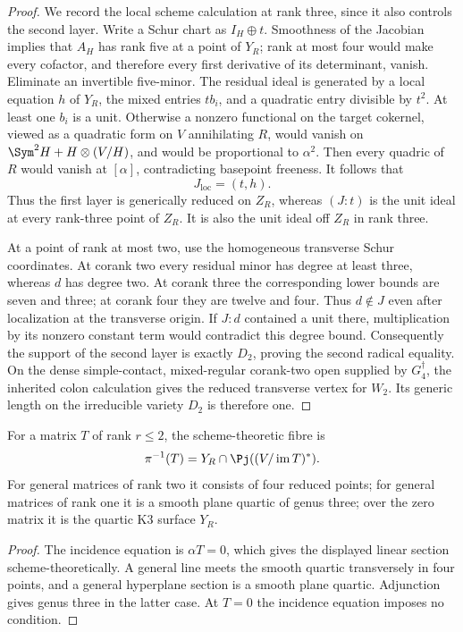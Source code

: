 \begin{proof}
We record the local scheme calculation at rank three, since it also
controls the second layer.  Write a Schur chart as \(I_H\oplus t\).
Smoothness of the Jacobian implies that \(A_H\) has rank five at a
point of \(Y_R\); rank at most four would make every cofactor, and
therefore every first derivative of its determinant, vanish.  Eliminate
an invertible five-minor.  The residual ideal is generated by a local
equation \(h\) of \(Y_R\), the mixed entries \(t b_i\), and a
quadratic entry divisible by \(t^2\).  At least one \(b_i\) is a
unit.  Otherwise a nonzero functional on the target cokernel,
viewed as a quadratic form on \(V\) annihilating \(R\), would
vanish on \(\Sym^2H+H\otimes(V/H)\), and would be proportional to
\(\alpha^2\).  Then every quadric of \(R\) would vanish at
\([\alpha]\), contradicting basepoint freeness.  It follows that
\[
 J_{\mathrm{loc}}=(t,h).
\]
Thus the first layer is generically reduced on \(Z_R\), whereas
\((J:t)\) is the unit ideal at every rank-three point of \(Z_R\).
It is also the unit ideal off \(Z_R\) in rank three.

At a point of rank at most two, use the homogeneous transverse Schur
coordinates.  At corank two every residual minor has degree at least
three, whereas \(d\) has degree two.  At corank three the corresponding
lower bounds are seven and three; at corank four they are twelve and
four.  Thus \(d\notin J\) even after localization at the transverse
origin.  If \(J:d\) contained a unit there, multiplication by its
nonzero constant term would contradict this degree bound.  Consequently
the support of the second layer is exactly \(D_2\), proving the
second radical equality.  On the dense simple-contact, mixed-regular
corank-two open supplied by \(G_4^\dagger\), the inherited colon
calculation gives the reduced transverse vertex for \(W_2\).
Its generic length on the irreducible variety \(D_2\) is therefore
one.
\end{proof}

\begin{corollary}
\label{cor:resolution-fibres}
For a matrix \(T\) of rank \(r\le2\), the scheme-theoretic fibre is
\[
 \pi^{-1}(T)=Y_R\cap\Pj((V/\operatorname{im}T)^*).
\]
For general matrices of rank two it consists of four reduced points;
for general matrices of rank one it is a smooth plane quartic of
genus three; over the zero matrix it is the quartic K3 surface \(Y_R\).
\end{corollary}
\begin{proof}
The incidence equation is \(\alpha T=0\), which gives the displayed
linear section scheme-theoretically.  A general line meets the smooth
quartic transversely in four points, and a general hyperplane section
is a smooth plane quartic.  Adjunction gives genus three in the latter
case.  At \(T=0\) the incidence equation imposes no condition.
\end{proof}

